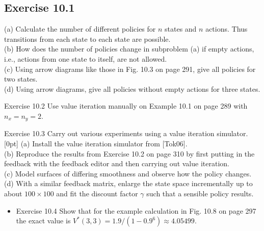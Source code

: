 \documentclass[10pt]{book}
\begin{document}
\begin{center}
\begin{enumerate}
\begin{center}
\begin{center}
\begin{center}
\begin{center}
\begin{center}
\section*{Exercise 10.1}
(a) Calculate the number of different policies for $n$ states and $n$ actions. Thus transitions from each state to each state are possible.\\
(b) How does the number of policies change in subproblem (a) if empty actions, i.e., actions from one state to itself, are not allowed.\\
(c) Using arrow diagrams like those in Fig. 10.3 on page 291, give all policies for two states.\\
(d) Using arrow diagrams, give all policies without empty actions for three states.

Exercise 10.2 Use value iteration manually on Example 10.1 on page 289 with $n_{x}=n_{y}=2$.

Exercise 10.3 Carry out various experiments using a value iteration simulator.\\
[0pt]
(a) Install the value iteration simulator from [Tok06].\\
(b) Reproduce the results from Exercise 10.2 on page 310 by first putting in the feedback with the feedback editor and then carrying out value iteration.\\
(c) Model surfaces of differing smoothness and observe how the policy changes.\\
(d) With a similar feedback matrix, enlarge the state space incrementally up to about $100 \times 100$ and fit the discount factor $\gamma$ such that a sensible policy results.

\begin{itemize}
  \item Exercise 10.4 Show that for the example calculation in Fig. 10.8 on page 297 the exact value is $V^{*}(3,3)=1.9 /\left(1-0.9^{6}\right) \approx 4.05499$.
\end{itemize}


\end{center}
\end{center}
\end{center}
\end{center}
\end{center}
\end{enumerate}
\end{center}
\end{document}
